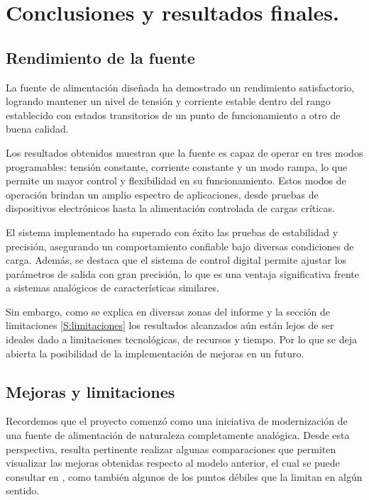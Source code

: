 \chapter{Conclusiones y resultados finales.}

\label{C:Conclusiones y resultados finales.}

\section{Rendimiento de la fuente} 
La fuente de alimentación diseñada ha demostrado un rendimiento satisfactorio, logrando mantener un nivel de tensión y corriente estable dentro del rango establecido con estados transitorios de un punto de funcionamiento a otro de buena calidad. \par
Los resultados obtenidos muestran que la fuente es capaz de operar en tres modos programables: tensión constante, corriente constante y un modo rampa, lo que permite un mayor control y flexibilidad en su funcionamiento. Estos modos de operación brindan un amplio espectro de aplicaciones, desde pruebas de dispositivos electrónicos hasta la alimentación controlada de cargas críticas. \par
El sistema implementado ha superado con éxito las pruebas de estabilidad y precisión, asegurando un comportamiento confiable bajo diversas condiciones de carga. Además, se destaca que el sistema de control digital permite ajustar los parámetros de salida con gran precisión, lo que es una ventaja significativa frente a sistemas analógicos de características similares.\par
Sin embargo, como se explica en diversas zonas del informe y la sección de limitaciones \ref{S:limitaciones} los resultados alcanzados aún están lejos de ser ideales dado a limitaciones tecnológicas, de recursos y tiempo. Por lo que se deja abierta la posibilidad de la implementación de mejoras en un futuro. \par

\section{Mejoras y limitaciones} 
Recordemos que el proyecto comenzó como una iniciativa de modernización de una fuente de alimentación de naturaleza completamente analógica. Desde esta perspectiva, resulta pertinente realizar algunas comparaciones que permiten visualizar las mejoras obtenidas respecto al modelo anterior, el cual se puede consultar en \cite{Fuente2023}, como también algunos de los puntos débiles que la limitan en algún sentido.\par


